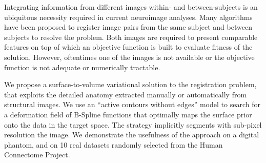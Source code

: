Integrating information from different images within- and between-subjects
  is an ubiquitous necessity required in current neuroimage analyses.
Many algorithms have been proposed to register image pairs from the same
  subject and between subjects to resolve the problem.
Both images are required to present comparable features on top of which
  an objective function is built to evaluate fitness of the solution.
However, oftentimes one of the images is not available or the objective
  function is not adequate or numerically tractable.

We propose a surface-to-volume variational solution to the registration problem,
  that exploits the detailed anatomy extracted manually or automatically
  from structural images.
We use an ``active contours without edges'' model to search for a
  deformation field of B-Spline functions that optimally maps the
  surface prior onto the data in the target space.
The strategy implicitly segments with sub-pixel resolution the image.
We demonstrate the usefulness of the approach on a digital phantom, and on
  10 real datasets randomly selected from the Human Connectome Project.
